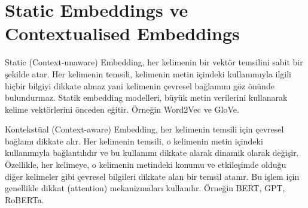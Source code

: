 \section{Static Embeddings ve Contextualised Embeddings}
Static (Context-unaware) Embedding, her kelimenin bir vektör temsilini sabit bir şekilde atar. Her kelimenin temsili, kelimenin metin içindeki kullanımıyla ilgili hiçbir bilgiyi dikkate almaz yani kelimenin çevresel bağlamını göz önünde bulundurmaz. Statik embedding modelleri, büyük metin verilerini kullanarak kelime vektörlerini önceden eğitir. Örneğin Word2Vec ve GloVe.

Kontekstüal (Context-aware) Embedding, her kelimenin temsili için çevresel bağlamı dikkate alır. Her kelimenin temsili, o kelimenin metin içindeki kullanımıyla bağlantılıdır ve bu kullanımı dikkate alarak dinamik olarak değişir. Özellikle, her kelimeye, o kelimenin metindeki konumu ve etkileşimde olduğu diğer kelimeler gibi çevresel bilgileri dikkate alan bir temsil atanır. Bu işlem için genellikle dikkat (attention) mekanizmaları kullanılır. Örneğin BERT, GPT, RoBERTa.

\newpage